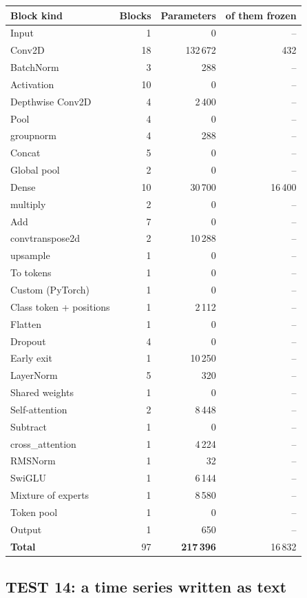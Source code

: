 {\small
\begin{longtable}{@{}lrrr@{}}
\toprule
\textbf{Block kind} & \textbf{Blocks} & \textbf{Parameters} & \textbf{of them frozen}\\
\midrule\endhead
Input & 1 & 0 & --\\
Conv2D & 18 & 132\,672 & 432\\
BatchNorm & 3 & 288 & --\\
Activation & 10 & 0 & --\\
Depthwise Conv2D & 4 & 2\,400 & --\\
Pool & 4 & 0 & --\\
groupnorm & 4 & 288 & --\\
Concat & 5 & 0 & --\\
Global pool & 2 & 0 & --\\
Dense & 10 & 30\,700 & 16\,400\\
multiply & 2 & 0 & --\\
Add & 7 & 0 & --\\
convtranspose2d & 2 & 10\,288 & --\\
upsample & 1 & 0 & --\\
To tokens & 1 & 0 & --\\
Custom (PyTorch) & 1 & 0 & --\\
Class token + positions & 1 & 2\,112 & --\\
Flatten & 1 & 0 & --\\
Dropout & 4 & 0 & --\\
Early exit & 1 & 10\,250 & --\\
LayerNorm & 5 & 320 & --\\
Shared weights & 1 & 0 & --\\
Self-attention & 2 & 8\,448 & --\\
Subtract & 1 & 0 & --\\
cross\_attention & 1 & 4\,224 & --\\
RMSNorm & 1 & 32 & --\\
SwiGLU & 1 & 6\,144 & --\\
Mixture of experts & 1 & 8\,580 & --\\
Token pool & 1 & 0 & --\\
Output & 1 & 650 & --\\
\midrule
\textbf{Total} & 97 & \textbf{217\,396} & 16\,832\\
\bottomrule
\end{longtable}}

\subsection{TEST 14: a time series written as text}
\label{sec:test14}

